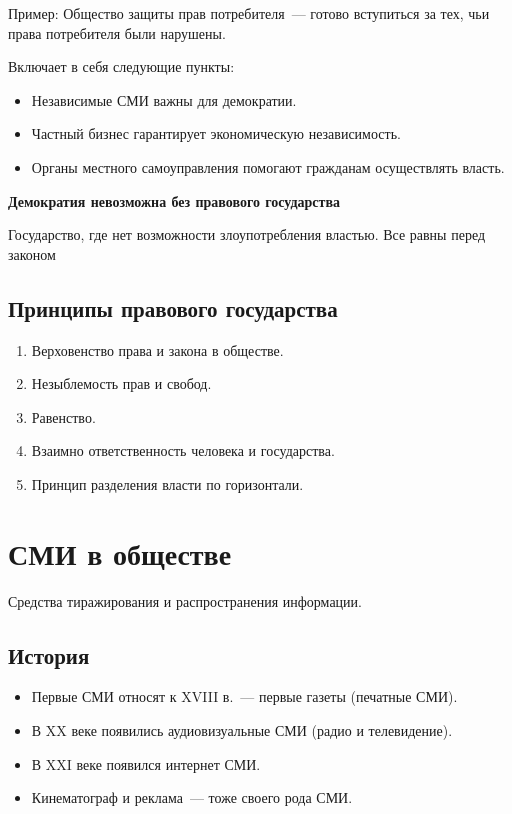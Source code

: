 \documentclass[12pt]{article}
\begin{document}
	Пример: Общество защиты прав потребителя~--- готово вступиться за тех, чьи права потребителя были нарушены.
	
	\begin{definition}
		Включает в себя следующие пункты:
		\begin{itemize}
			\item Независимые СМИ важны для демократии.
			\item Частный бизнес гарантирует экономическую независимость.
			\item Органы местного самоуправления помогают гражданам осуществлять власть.
		\end{itemize}
	\end{definition}
	
	\noindent \textbf{Демократия невозможна без правового государства}
	
	\begin{definition}
		Государство, где нет возможности злоупотребления властью. Все равны перед законом
	\end{definition}
	
	\subsection{Принципы правового государства}
	
	\begin{enumerate}
		\item Верховенство права и закона в обществе.
		\item Незыблемость прав и свобод.
		\item Равенство.
		\item Взаимно ответственность человека и государства.
		\item Принцип разделения власти по горизонтали.
	\end{enumerate}
	
	\section{СМИ в обществе}
	
	\begin{definition}[СМИ]
		Средства тиражирования и распространения информации.
	\end{definition}
	
	\subsection{История}
	\begin{itemize}
		\item Первые СМИ относят к XVIII в.~--- первые газеты (печатные СМИ).
		\item В XX веке появились аудиовизуальные СМИ (радио и телевидение).
		\item В XXI веке появился интернет СМИ.
		\item Кинематограф и реклама~--- тоже своего рода СМИ.
	\end{itemize}
	
\end{document}
